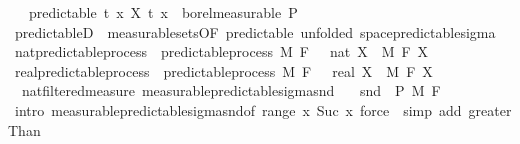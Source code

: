 \begin{isabellebody}
\ \ \ predictable{\isacharcolon}{\kern0pt}\ {\isachardoublequoteopen}{\isacharparenleft}{\kern0pt}{\isasymlambda}{\isacharparenleft}{\kern0pt}t{\isacharcomma}{\kern0pt}\ x{\isacharparenright}{\kern0pt}{\isachardot}{\kern0pt}\ X\ t\ x{\isacharparenright}{\kern0pt}\ {\isasymin}\ borel{\isacharunderscore}{\kern0pt}measurable\ {\isasymSigma}\isactrlsub P{\isachardoublequoteclose}\isanewline
{}\isanewline
\isanewline
{}\isamarkupfalse%
\ predictableD\ {\isacharequal}{\kern0pt}\ measurable{\isacharunderscore}{\kern0pt}sets{\isacharbrackleft}{\kern0pt}OF\ predictable{\isacharcomma}{\kern0pt}\ unfolded\ space{\isacharunderscore}{\kern0pt}predictable{\isacharunderscore}{\kern0pt}sigma{\isacharbrackright}{\kern0pt}\isanewline
\isanewline
{}\isamarkupfalse%
\isanewline
\isanewline
\isanewline
\isanewline
{}\isamarkupfalse%
\ nat{\isacharunderscore}{\kern0pt}predictable{\isacharunderscore}{\kern0pt}process\ {\isacharequal}{\kern0pt}\ predictable{\isacharunderscore}{\kern0pt}process\ M\ F\ {\isachardoublequoteopen}{}\ {\isacharcolon}{\kern0pt}{\isacharcolon}{\kern0pt}\ nat{\isachardoublequoteclose}\ X\ \ M\ F\ X\isanewline
{}\isamarkupfalse%
\ real{\isacharunderscore}{\kern0pt}predictable{\isacharunderscore}{\kern0pt}process\ {\isacharequal}{\kern0pt}\ predictable{\isacharunderscore}{\kern0pt}process\ M\ F\ {\isachardoublequoteopen}{}\ {\isacharcolon}{\kern0pt}{\isacharcolon}{\kern0pt}\ real{\isachardoublequoteclose}\ X\ \ M\ F\ X\isanewline
\isanewline
{}\isamarkupfalse%
\ {\isacharparenleft}{\kern0pt}\ nat{\isacharunderscore}{\kern0pt}filtered{\isacharunderscore}{\kern0pt}measure{\isacharparenright}{\kern0pt}\ measurable{\isacharunderscore}{\kern0pt}predictable{\isacharunderscore}{\kern0pt}sigma{\isacharunderscore}{\kern0pt}snd{\isacharprime}{\kern0pt}{\isacharcolon}{\kern0pt}\isanewline
\ \ \ {\isachardoublequoteopen}snd\ {\isasymin}\ {\isasymSigma}\isactrlsub P\ {\isasymrightarrow}\isactrlsub M\ F\ {}{\isachardoublequoteclose}\isanewline
%
\isadelimproof
\ \ %
\endisadelimproof
%
\isatagproof
{}\isamarkupfalse%
\ {\isacharparenleft}{\kern0pt}intro\ measurable{\isacharunderscore}{\kern0pt}predictable{\isacharunderscore}{\kern0pt}sigma{\isacharunderscore}{\kern0pt}snd{\isacharbrackleft}{\kern0pt}of\ {\isachardoublequoteopen}range\ {\isacharparenleft}{\kern0pt}{\isasymlambda}x{\isachardot}{\kern0pt}\ {\isacharbraceleft}{\kern0pt}Suc\ x{\isacharbraceright}{\kern0pt}{\isacharparenright}{\kern0pt}{\isachardoublequoteclose}{\isacharbrackright}{\kern0pt}{\isacharparenright}{\kern0pt}\ {\isacharparenleft}{\kern0pt}force\ {\isacharbar}{\kern0pt}\ simp\ add{\isacharcolon}{\kern0pt}\ greaterThan{\isacharunderscore}{\kern0pt}{}{\isacharparenright}{\kern0pt}{\isacharplus}{\kern0pt}%

\end{isabellebody}
